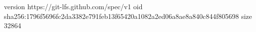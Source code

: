 version https://git-lfs.github.com/spec/v1
oid sha256:1796f5696fc2da3382e791feb13f65420a1082a2ed06a8ae8a840c844f805698
size 32864
